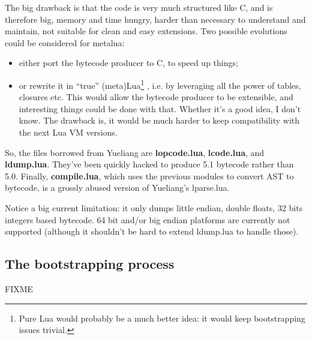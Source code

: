 The big drawback is that the code is very much structured like C, and
is therefore big, memory and time hungry, harder than necessary to
understand and maintain, not suitable for clean and easy
extensions. Two possible evolutions could be considered for metalua:

\begin{itemize}
\item either port the bytecode producer to C, to speed up things;
\item or rewrite it in ``true'' (meta)Lua\footnote{Pure Lua would
    probably be a much better idea: it would keep bootstrapping issues
    trivial.} , i.e. by leveraging all the power of tables, closures
  etc. This would allow the bytecode producer to be extensible, and
  interesting things could be done with that. Whether it's a good
  idea, I don't know. The drawback is, it would be much harder to keep
  compatibility with the next Lua VM versions.
\end{itemize}

So, the files borrowed from Yueliang are {\bf lopcode.lua}, {\bf
  lcode.lua}, and {\bf ldump.lua}. They've been quickly hacked to
produce 5.1 bytecode rather than 5.0. Finally, {\bf compile.lua},
which uses the previous modules to convert AST to bytecode, is a
grossly abused version of Yueliang's lparse.lua.

Notice a big current limitation: it only dumps little endian, double
floats, 32 bits integers based bytecode. 64 bit and/or big endian
platforms are currently not supported (although it shouldn't be hard
to extend ldump.lua to handle those).
 
\subsection{The bootstrapping process}

FIXME
